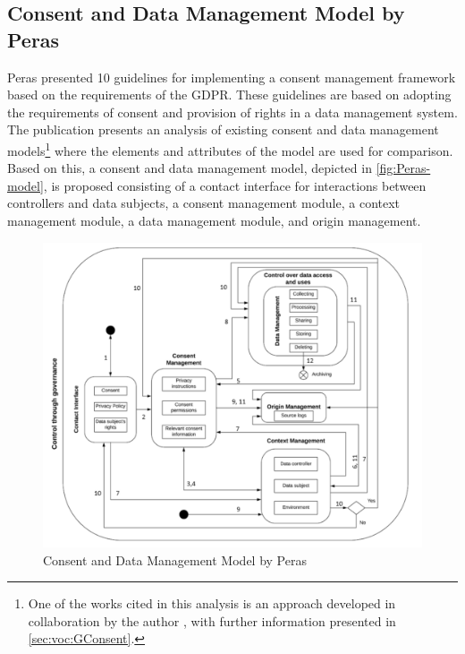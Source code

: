 \subsection{Consent and Data Management Model by Peras}
Peras \cite{peras_guidelines_2018} presented 10 guidelines for implementing a consent management framework based on the requirements of the GDPR. These guidelines are based on adopting the requirements of consent and provision of rights in a data management system. The publication presents an analysis of existing consent and data management models\footnote{One of the works cited in this analysis is an approach developed in collaboration by the author \cite{fatema_compliance_2017}, with further information presented in \autoref{sec:voc:GConsent}.} where the elements and attributes of the model are used for comparison. Based on this, a consent and data management model, depicted in \autoref{fig:Peras-model}, is proposed consisting of a contact interface for interactions between controllers and data subjects, a consent management module, a context management module, a data management module, and origin management.
\begin{figure}[htbp]
    \centering
    \includegraphics[width=\linewidth]{img/Peras_model.png}
    \caption{Consent and Data Management Model by Peras \cite{peras_guidelines_2018}}
    \label{fig:Peras-model}
\end{figure}

